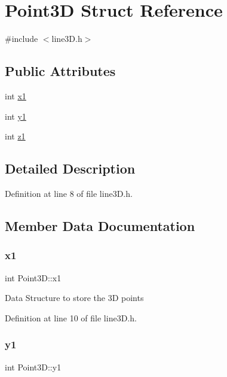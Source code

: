 \hypertarget{struct_point3_d}{}\section{Point3D Struct Reference}
\label{struct_point3_d}


{\ttfamily \#include $<$line3\+D.\+h$>$}

\subsection*{Public Attributes}
\begin{DoxyCompactItemize}
\item 
int \mbox{\hyperlink{struct_point3_d_a0077cecb405873533d8c2cec2e6c36a2}{x1}}
\item 
int \mbox{\hyperlink{struct_point3_d_a74b0eb35f9ab7a0d8fd0aa80f2eeb968}{y1}}
\item 
int \mbox{\hyperlink{struct_point3_d_aba896f87147261cd12e5706bfb0ccf1f}{z1}}
\end{DoxyCompactItemize}


\subsection{Detailed Description}


Definition at line 8 of file line3\+D.\+h.



\subsection{Member Data Documentation}
\mbox{\label{struct_point3_d_a0077cecb405873533d8c2cec2e6c36a2}} 
\subsubsection{\texorpdfstring{x1}{x1}}
{\footnotesize\ttfamily int Point3\+D\+::x1}

Data Structure to store the 3D points 

Definition at line 10 of file line3\+D.\+h.

\mbox{\label{struct_point3_d_a74b0eb35f9ab7a0d8fd0aa80f2eeb968}} 
\subsubsection{\texorpdfstring{y1}{y1}}
{\footnotesize\ttfamily int Point3\+D\+::y1}



